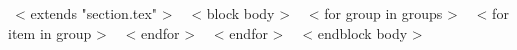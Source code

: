 ~< extends "section.tex" >~
~< block body >~
  ~< for group in groups >~
    ~< for item in group >~
    ~< endfor >~
  ~< endfor >~
~< endblock body >~
